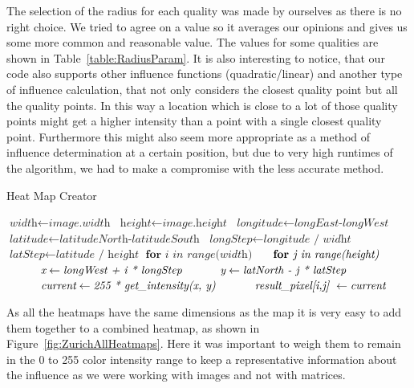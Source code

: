 \documentclass[letterpaper]{article}
\begin{document}
\indent The selection of the radius for each quality was made by ourselves as there is no right choice.
We tried to agree on a value so it averages our opinions and gives us some more common and reasonable value.
The values for some qualities are shown in Table~\ref{table:RadiusParam}. It is also interesting to notice,
that our code also supports other influence functions (quadratic/linear) and another type of influence calculation,
that not only considers the closest quality point but all the quality points. In this way a location which is close
to a lot of those quality points might get a higher intensity than a point with a single closest quality point.
Furthermore this might also seem more appropriate as a method of influence determination at a certain position,
but due to very high runtimes of the algorithm, we had to make a compromise with the less accurate method.

\begin{algorithm}
    \caption{Heat Map Creator}\label{fig:heatMapCreation}
    \begin{algorithmic}[1]
        	 \State $\textit{width} \gets \textit{image.width}$
        	 \State $\textit{height} \gets \textit{image.height}$
        	 \State $\textit{longitude} \gets \textit{longEast-longWest}$
        	 \State $\textit{latitude} \gets \textit{latitudeNorth-latitudeSouth}$
            \State $\textit{longStep} \gets \textit{longitude / widht}$
            \State $\textit{latStep} \gets \textit{latitude / height}$
            \State $\textbf{for } \textit{i in range(width)} $
            \State $\indent \textbf{for } \textit{j in range(height)} $
            \State $\indent \indent \textit{x} \gets \textit{longWest + i * longStep}$
            \State $\indent \indent \textit{y} \gets \textit{latNorth - j * latStep}$
            \State $\indent \indent \textit{current} \gets \textit{255 * get\_intensity(x, y)}$
            \State $\indent \indent \textit{result\_pixel[i,j] } \gets \textit{current}$
        \EndProcedure
    \end{algorithmic}
\end{algorithm}

\indent As all the heatmaps have the same dimensions as the map it is very easy to add them together to a combined heatmap,
as shown in Figure~\ref{fig:ZurichAllHeatmaps}. Here it was important to weigh them to remain in the 0 to 255 color intensity
range to keep a representative information about the influence as we were working with images and not with matrices.
\end{document}
